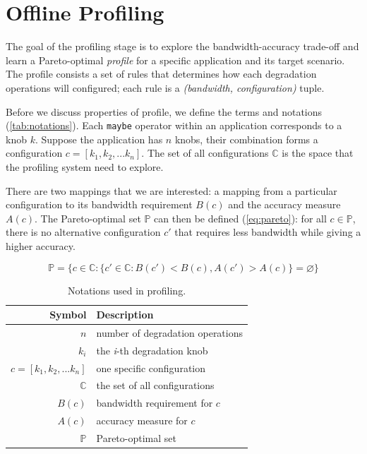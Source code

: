\section{Offline Profiling}
\label{sec:profiling}

The goal of the profiling stage is to explore the bandwidth-accuracy trade-off
and learn a Pareto-optimal \textit{profile} for a specific application and its
target scenario. The profile consists a set of rules that determines how each
degradation operations will configured; each rule is a \textit{(bandwidth,
  configuration)} tuple.

Before we discuss properties of profile, we define the terms and notations
(\autoref{tab:notations}). Each \texttt{maybe} operator within an application
corresponds to a knob $k$. Suppose the application has $n$ knobs, their
combination forms a configuration $c = [k_{1}, k_{2}, ... k_{n}]$. The set of
all configurations $\mathbb{C}$ is the space that the profiling system need to
explore.

There are two mappings that we are interested: a mapping from a particular
configuration to its bandwidth requirement $B(c)$ and the accuracy measure
$A(c)$. The Pareto-optimal set $\mathbb{P}$ can then be defined
(\autoref{eq:pareto}): for all $c \in \mathbb{P}$, there is no alternative
configuration $c'$ that requires less bandwidth while giving a higher accuracy.

{\small
\begin{equation}
  \mathbb{P} = \{ c \in \mathbb{C} : \{ c' \in \mathbb{C}: B(c') < B(c),
  A(c') > A(c) \} = \varnothing\}
  \label{eq:pareto}
\end{equation}
}%

\begin{table}
  \centering
  \begin{tabular}{r l}
    \toprule
    \textbf{Symbol} & \textbf{Description} \\
    \midrule
    $n$ & number of degradation operations \\
    $k_i$ & the \textit{i}-th degradation knob \\
    $c = [k_{1}, k_{2}, ... k_{n}]$ & one specific configuration \\
    $\mathbb{C}$ & the set of all configurations \\
    \midrule
    $B(c)$ & bandwidth requirement for $c$ \\
    $A(c)$ & accuracy measure for $c$ \\
    $\mathbb{P}$ & Pareto-optimal set \\
    \bottomrule
  \end{tabular}
  \caption{Notations used in profiling.}
  \label{tab:notations}
\end{table}

